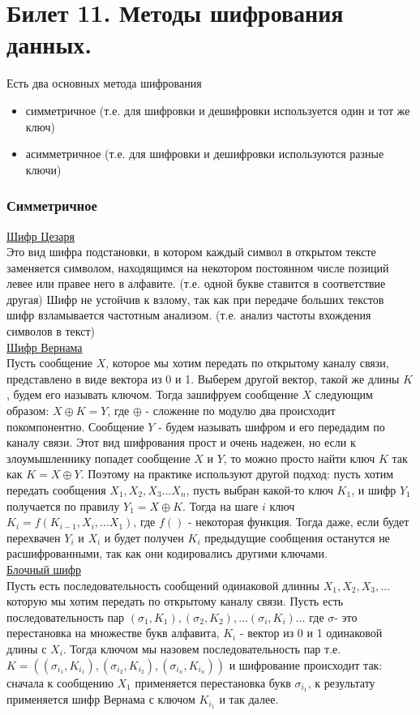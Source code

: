 \newpage
\section {Билет 11. Методы шифрования данных.}

Есть два основных метода шифрования 
\begin {itemize}
\item симметричное (т.е. для шифровки и дешифровки используется один и тот же ключ)
\item асимметричное (т.е. для шифровки и дешифровки используются разные ключи)
\end {itemize}

\subsubsection{Симметричное}
\href{https://ru.wikipedia.org/wiki/Шифр_Цезаря}{Шифр Цезаря} \\
Это вид шифра подстановки, в котором каждый символ в открытом тексте заменяется символом, находящимся на некотором постоянном числе позиций левее или правее него в алфавите. (т.е. одной букве ставится в соответствие другая) Шифр не устойчив к взлому, так как при передаче больших текстов шифр взламывается частотным анализом. (т.е. анализ частоты вхождения символов в текст)  \\
\href{https://ru.wikipedia.org/wiki/Шифр_Вернама}{Шифр Вернама} \\
Пусть сообщение $X$, которое мы хотим передать по открытому каналу связи, представлено в виде вектора из 0 и 1. Выберем другой вектор, такой же длины $K$, будем его называть ключом. Тогда зашифруем сообщение $X$ следующим образом: $X \oplus K = Y$, где $\oplus$ - сложение по модулю два происходит покомпонентно. Сообщение $Y$ - будем называть шифром и его передадим по каналу связи. Этот вид шифрования прост и очень надежен, но если к злоумышленнику попадет сообщение $X$ и $Y$, то можно просто найти ключ $K$ так как $K = X \oplus Y$. Поэтому на практике используют другой подход: пусть хотим передать сообщения $X_1, X_2, X_3 \dots X_n$, пусть выбран какой-то ключ $K_1$, и шифр $Y_1$ получается по правилу $Y_1 = X \oplus K$. Тогда на шаге $i$ ключ $K_i = f (K_{i - 1}, X_i, \dots X_1)$, где $f()$ - некоторая функция. Тогда даже, если будет перехвачен $Y_i$ и $X_i$ и будет получен $K_i$ предыдущие сообщения останутся не расшифрованными, так как они кодировались другими ключами. \\
\href{https://ru.wikipedia.org/wiki/Блочный_шифр}{Блочный шифр} \\
Пусть есть последовательность сообщений одинаковой длинны $X_1, X_2, X_3, \dots$ которую мы хотим передать по открытому каналу связи. Пусть есть последовательность пар $(\sigma_1, K_1), (\sigma_2, K_2), \dots (\sigma_i, K_i) \dots$ где $\sigma$- это перестановка на множестве букв алфавита, $K_i$ - вектор из 0 и 1 одинаковой длины с $X_i$. Тогда ключом мы назовем последовательность пар т.е. $K = ((\sigma_{i_1}, K_{i_1}), (\sigma_{i_2}, K_{i_2}), (\sigma_{i_n}, K_{i_n}))$ и шифрование происходит так: сначала к сообщению $X_1$ применяется перестановка букв $\sigma_{i_1}$, к результату применяется шифр Вернама с ключом $K_{i_1}$ и так далее.

